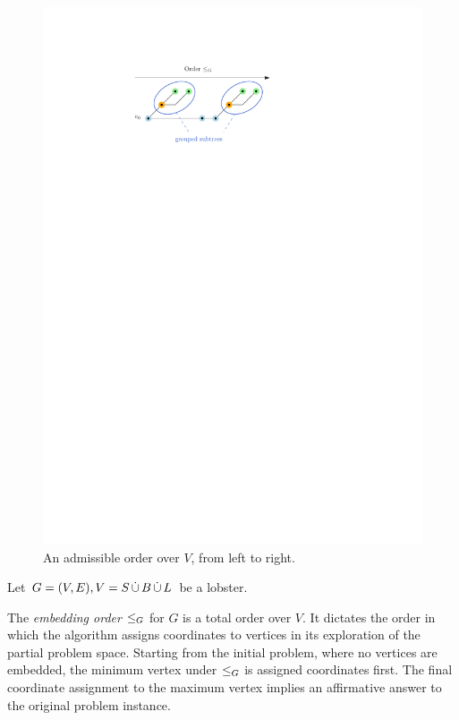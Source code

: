 \begin{figure}[b]
    \centering
    \includegraphics{graphics/ch4_order.pdf}
    \caption[Admissible order]{An admissible order over $V$, from left to right.}
    \label{fig:ch4-order}
\end{figure}

Let $G = (V, E), V = S \,\dot{\cup}\, B \,\dot{\cup}\, L$ be a lobster. 

The \emph{embedding order} $\leq_G$ for $G$ is a total order over $V$. It dictates the order in which the algorithm assigns coordinates to vertices in its exploration of the partial problem space. Starting from the initial problem, where no vertices are embedded, the minimum vertex under $\leq_G$ is assigned coordinates first. The final coordinate assignment to the maximum vertex implies an affirmative answer to the original problem instance.

